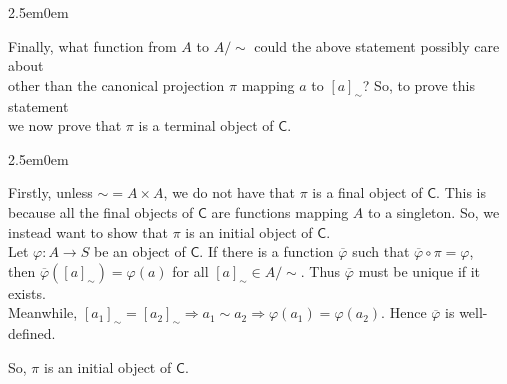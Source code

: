 \documentclass{book}
\newcommand{\exP}{%
   \color{VioletRed}%
   \fontsize{12}{14}\selectfont%
}
\newenvironment{myIndent}{%
   \begin{adjustwidth}{2.5em}{0em}%
}{%
   \end{adjustwidth}%
}
\newcommand{\mcateg}[1]{{\bm{\mathsf{#1}}}}
\newcommand{\retTwo}{\hfill\bigbreak}
\begin{document}
\begin{myIndent}
   Finally, what function from $A$ to $A / {\sim}$ could the above statement possibly care about\\ other than the canonical projection $\pi$ mapping $a$ to $[a]_\sim$? So, to prove this statement\\ we now prove that $\pi$ is a terminal object of $\mcateg{C}$.

   \newpage

   {\begin{myIndent}\exP
      Firstly, unless ${\sim} = A \times A$, we do not have that $\pi$ is a final object of $\mcateg{C}$. This is\\ because all the final objects of $\mcateg{C}$ are functions mapping $A$ to a singleton. So, we\\ instead want to show that $\pi$ is an initial object of $\mcateg{C}$. \\ [-2pt]

      Let $\varphi: A \longrightarrow S$ be an object of $\mcateg{C}$. If there is a function $\overbar{\varphi}$ such that $\overbar{\varphi} \circ \pi = \varphi$,\\ [-2pt] then $\overbar{\varphi}([a]_\sim) = \varphi(a)$ for all $[a]_\sim \in A/ {\sim}$. Thus $\overbar{\varphi}$ must be unique if it exists.\\ [-2pt] Meanwhile, $[a_1]_\sim = [a_2]_\sim \Longrightarrow a_1 \sim a_2 \Longrightarrow \varphi(a_1) = \varphi(a_2)$. Hence $\overbar{\varphi}$ is well-\\defined.\retTwo

      So, $\pi$ is an initial object of $\mcateg{C}$.\retTwo
   \end{myIndent}}
\end{myIndent}
\end{document}
